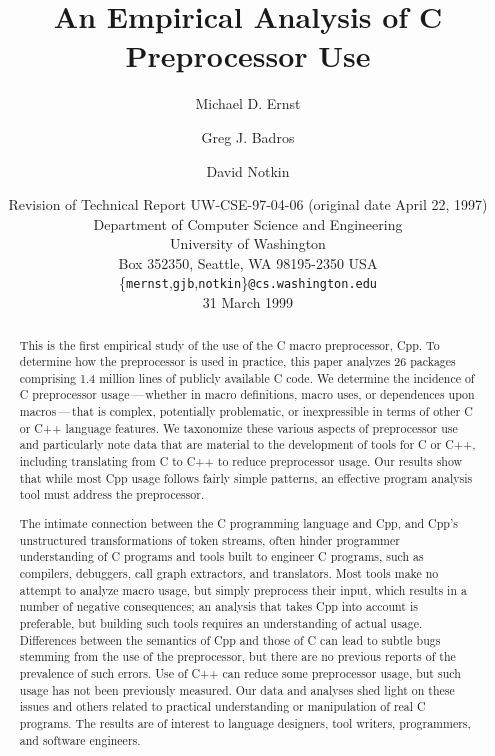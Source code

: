\documentclass[10pt]{article}
\def\numpackages{26}
\def\numlinesalmost{1.4 million}
\begin{document}
% 


\title{An Empirical Analysis of C Preprocessor Use}

\author{Michael D. Ernst \and Greg J. Badros \and David Notkin}

\date{Revision of Technical Report UW-CSE-97-04-06 (original date April 22, 1997) \\
Department of Computer Science and Engineering \\
University of Washington \\
Box 352350, Seattle, WA  98195-2350  USA \\
{\small \{{\tt mernst},{\tt gjb},{\tt notkin}\}{\tt @cs.washington.edu}} \\
31 March 1999}  

\maketitle

\begin{abstract}
  This is the first empirical study of the use of the C macro preprocessor,
  Cpp.  To determine how the preprocessor is used in practice, this paper
  analyzes {\numpackages} packages comprising {\numlinesalmost} lines of
  publicly available C code.  We determine the incidence of C preprocessor
  usage\,---\,whether in macro definitions, macro uses, or dependences upon
  macros\,---\,that is complex, potentially problematic, or inexpressible
  in terms of other C or C++ language features.  We taxonomize these
  various aspects of preprocessor use and particularly note data that are
  material to the development of tools for C or C++, including translating
  from C to C++ to reduce preprocessor usage.  Our results show that while
  most Cpp usage follows fairly simple patterns, an effective program
  analysis tool must address the preprocessor.
  
  The intimate connection between the C programming language and Cpp, and
  Cpp's unstructured transformations of token streams, often hinder
  programmer understanding of C programs and tools built to engineer C
  programs, such as compilers, debuggers, call graph extractors, and
  translators.  Most tools make no attempt to analyze macro usage, but
  simply preprocess their input, which results in a number of negative
  consequences; an analysis that takes Cpp into account is preferable, but
  building such tools requires an understanding of actual usage.
  Differences between the semantics of Cpp and those of C can lead to
  subtle bugs stemming from the use of the preprocessor, but there are no
  previous reports of the prevalence of such errors.  Use of C++ can reduce
  some preprocessor usage, but such usage has not been previously measured.
  Our data and analyses shed light on these issues and others related to
  practical understanding or manipulation of real C programs.  The results
  are of interest to language designers, tool writers, programmers, and
  software engineers.
\end{abstract}
\end{document}

